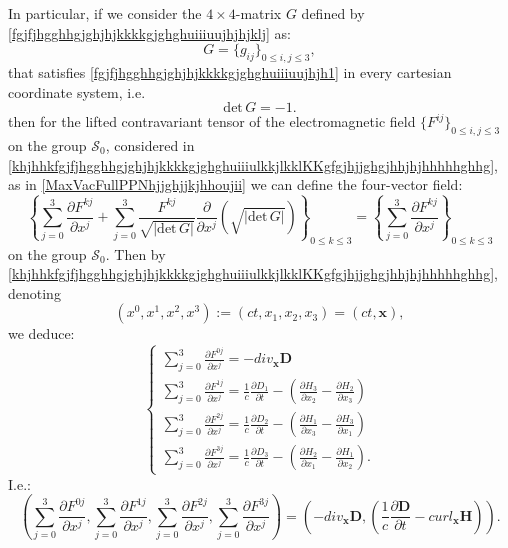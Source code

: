 \documentclass{article}
\theoremstyle{definition}
\theoremstyle{remark}
\renewcommand{\vec}[1]{\mathbf{#1}}
\newcommand{\er}{\eqref}
\newcommand{\er}{\eqref}
\begin{document}
In particular, if we consider the $4\times 4$-matrix $G$ defined by
\er{fgjfjhgghhgjghjhjkkkkgjghghuiiiuujhjhjklj} as:
\begin{equation}\label{fgjfjhgghhgjghjhjkkkkgjghghuiiiuujhjhjklj1}
G=\{g_{ij}\}_{0\leq i,j\leq 3},
\end{equation}
that satisfies \er{fgjfjhgghhgjghjhjkkkkgjghghuiiiuujhjh1} in every
cartesian coordinate system, i.e.
\begin{equation}\label{fgjfjhgghhgjghjhjkkkkgjghghuiiiuujhjhhjjg}
\text{det}\,G=-1.
\end{equation}
then for the lifted contravariant tensor of the electromagnetic
field $\{F^{ij}\}_{0\leq i,j\leq 3}$ on the group $\mathcal{S}_0$,
considered in
\er{khjhhkfgjfjhgghhgjghjhjkkkkgjghghuiiiulkkjlkklKKgfgjhjjghgjhhjhjhhhhhghhg},
as in \er{MaxVacFullPPNhjjghjjkjhhoujii} we can define the
four-vector field:
\begin{equation}\label{MaxVacFullPPNhjjghjjkjhhoujiiikjjihjhiuiu}
\left\{\sum_{j=0}^{3}\frac{\partial F^{kj}}{\partial
x^j}+\sum_{j=0}^{3}\frac{F^{kj}}{\sqrt{|\text{det}\,G|}}\frac{\partial}{\partial
x^j}\left(\sqrt{|\text{det}\,G|}\right)\right\}_{0\leq k\leq
3}=\left\{\sum_{j=0}^{3}\frac{\partial F^{kj}}{\partial
x^j}\right\}_{0\leq k\leq 3}
\end{equation}
on the group $\mathcal{S}_0$. Then by
\er{khjhhkfgjfjhgghhgjghjhjkkkkgjghghuiiiulkkjlkklKKgfgjhjjghgjhhjhjhhhhhghhg},
denoting
$$(x^0,x^1,x^2,x^3):=(ct,x_1,x_2,x_3)=(ct,\vec x),$$
we deduce:
\begin{equation}\label{khjhhkfgjfjhgghhgjghjhjkkkkgjghghuiiiulkkjlkklKKgfgjhjjghgjhhjhjhhhhhghhgtyytojjj}
\begin{cases}
\sum_{j=0}^{3}\frac{\partial F^{0j}}{\partial x^j}=-div_{\vec x}\vec D\\
\sum_{j=0}^{3}\frac{\partial F^{1j}}{\partial x^j}=\frac{1}{c}\frac{\partial D_1}{\partial t}-\left(\frac{\partial H_3}{\partial x_2}-\frac{\partial H_2}{\partial x_3}\right)\\
\sum_{j=0}^{3}\frac{\partial F^{2j}}{\partial x^j}=\frac{1}{c}\frac{\partial D_2}{\partial t}-\left(\frac{\partial H_1}{\partial x_3}-\frac{\partial H_3}{\partial x_1}\right)\\
\sum_{j=0}^{3}\frac{\partial F^{3j}}{\partial
x^j}=\frac{1}{c}\frac{\partial D_3}{\partial t}-\left(\frac{\partial
H_2}{\partial x_1}-\frac{\partial H_1}{\partial x_2}\right).
\end{cases}
\end{equation}
I.e.:
\begin{equation}\label{khjhhkfgjfjhgghhgjghjhjkkkkgjghghuiiiulkkjlkklKKgfgjhjjghgjhhjhjhhhhhghhgtyytojjjjj}
\left(\sum_{j=0}^{3}\frac{\partial F^{0j}}{\partial
x^j},\sum_{j=0}^{3}\frac{\partial F^{1j}}{\partial
x^j},\sum_{j=0}^{3}\frac{\partial F^{2j}}{\partial
x^j},\sum_{j=0}^{3}\frac{\partial F^{3j}}{\partial
x^j}\right)=\left(-div_{\vec x}\vec D,
\left(\frac{1}{c}\frac{\partial \vec D}{\partial t}-curl_{\vec
x}\vec H\right)\right).
\end{equation}
\end{document}
